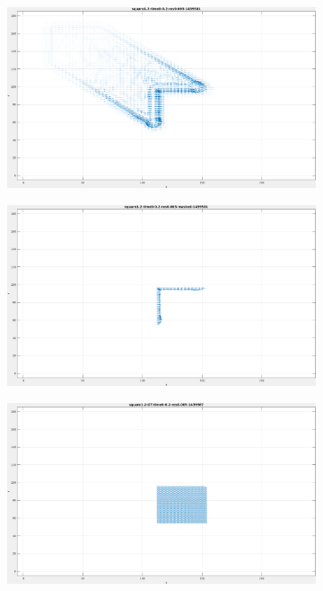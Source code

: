 \begin{figure}[tb]
\centering
\begin{subfigure}{.45\textwidth}
  \centering
  \includegraphics[height=.6\linewidth]{figs/square12/square12-1.png}
  \caption{}
\end{subfigure}
\begin{subfigure}{.45\textwidth}
  \includegraphics[height=.6\linewidth]{figs/square12/square12-masked-1.png}
  \caption{}
\end{subfigure}
\begin{subfigure}{.45\textwidth}
  \centering
  \includegraphics[height=.6\linewidth]{figs/square12/square12-GT-1.png}

\end{subfigure}
\end{figure}
